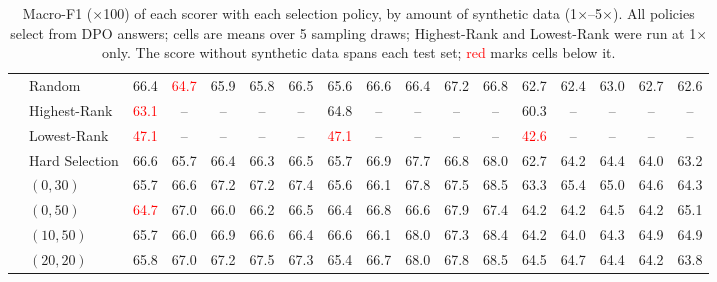 \begin{table}[t]
\begin{tabular}{llccccccccccccccc}
 & Random & 66.4 & \textcolor{red}{64.7} & 65.9 & 65.8 & 66.5 & 65.6 & 66.6 & 66.4 & 67.2 & 66.8 & 62.7 & 62.4 & 63.0 & 62.7 & 62.6 \\
 & Highest-Rank & \textcolor{red}{63.1} & -- & -- & -- & -- & 64.8 & -- & -- & -- & -- & 60.3 & -- & -- & -- & -- \\
 & Lowest-Rank & \textcolor{red}{47.1} & -- & -- & -- & -- & \textcolor{red}{47.1} & -- & -- & -- & -- & \textcolor{red}{42.6} & -- & -- & -- & -- \\
 & Hard Selection & 66.6 & 65.7 & 66.4 & 66.3 & 66.5 & 65.7 & 66.9 & 67.7 & 66.8 & 68.0 & 62.7 & 64.2 & 64.4 & 64.0 & 63.2 \\
 & $(0, 30)$ & 65.7 & 66.6 & 67.2 & 67.2 & 67.4 & 65.6 & 66.1 & 67.8 & 67.5 & 68.5 & 63.3 & 65.4 & 65.0 & 64.6 & 64.3 \\
 & $(0, 50)$ & \textcolor{red}{64.7} & 67.0 & 66.0 & 66.2 & 66.5 & 66.4 & 66.8 & 66.6 & 67.9 & 67.4 & 64.2 & 64.2 & 64.5 & 64.2 & 65.1 \\
 & $(10, 50)$ & 65.7 & 66.0 & 66.9 & 66.6 & 66.4 & 66.6 & 66.1 & 68.0 & 67.3 & 68.4 & 64.2 & 64.0 & 64.3 & 64.9 & 64.9 \\
 & $(20, 20)$ & 65.8 & 67.0 & 67.2 & 67.5 & 67.3 & 65.4 & 66.7 & 68.0 & 67.8 & 68.5 & 64.5 & 64.7 & 64.4 & 64.2 & 63.8 \\
\bottomrule
\end{tabular}
\caption{Macro-F1 ($\times$100) of each scorer with each selection policy, by amount of synthetic data (1$\times$--5$\times$). All policies select from DPO answers; cells are means over 5 sampling draws; Highest-Rank and Lowest-Rank were run at 1$\times$ only. The score without synthetic data spans each test set; \textcolor{red}{red} marks cells below it.}
\label{tab:appendix-selection-amount}
\end{table}
